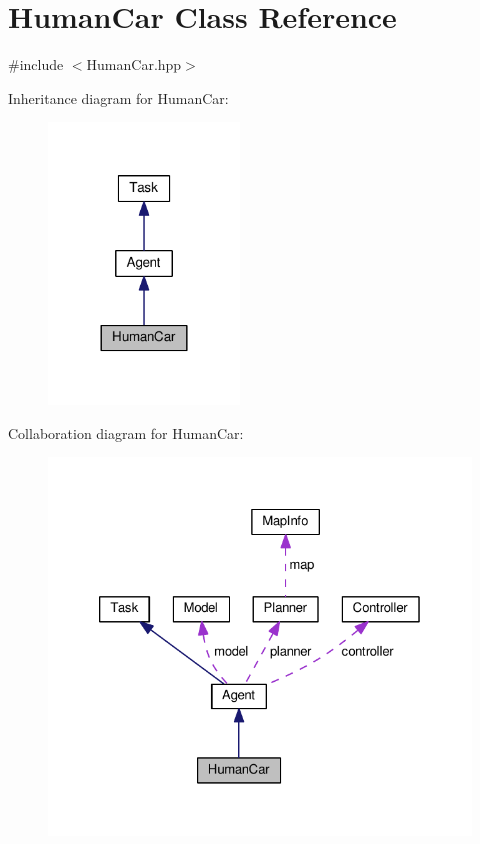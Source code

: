 \hypertarget{classHumanCar}{}\section{Human\+Car Class Reference}
\label{classHumanCar}


{\ttfamily \#include $<$Human\+Car.\+hpp$>$}



Inheritance diagram for Human\+Car\+:\nopagebreak
\begin{figure}[H]
\begin{center}
\leavevmode
\includegraphics[width=144pt]{classHumanCar__inherit__graph}
\end{center}
\end{figure}


Collaboration diagram for Human\+Car\+:\nopagebreak
\begin{figure}[H]
\begin{center}
\leavevmode
\includegraphics[width=326pt]{classHumanCar__coll__graph}
\end{center}
\end{figure}
